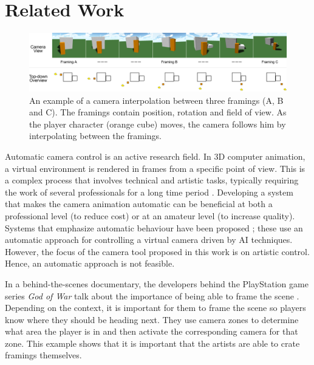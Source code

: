 \section{Related Work}\label{relatedWork}

\begin{figure}[htbp]
\centering
\includegraphics[width=1\textwidth]{Pics/InterpolationExample}
\caption{An example of a camera interpolation between three framings (A, B and C). The framings contain position, rotation and field of view. As the player character (orange cube) moves, the camera follows him by interpolating between the framings.}
\label{fig:InterpolationExample}
\end{figure}

Automatic camera control is an active research field. In 3D computer animation, a virtual environment is rendered in frames from a specific point of view. This is a complex process that involves technical and artistic tasks, typically requiring the work of several professionals for a long time period \cite{burelli_automatic_2014}. Developing a system that makes the camera animation automatic can be beneficial at both a professional level (to reduce cost) or at an amateur level (to increase quality). Systems that emphasize automatic behaviour have been proposed \cite{bourne_constraintBased_2008, burelli_automatic_2014}; these use an automatic approach for controlling a virtual camera driven by AI techniques. However, the focus of the camera tool proposed in this work is on artistic control. Hence, an automatic approach is not feasible.

In a behind-the-scenes documentary, the developers behind the PlayStation game series \textit{God of War} talk about the importance of being able to frame the scene \cite{gow_camera}. Depending on the context, it is important for them to frame the scene so players know where they should be heading next. They use camera zones to determine what area the player is in and then activate the corresponding camera for that zone. This example shows that it is important that the artists are able to crate framings themselves.

